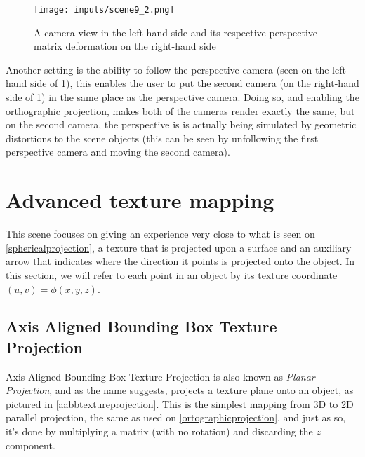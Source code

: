 \documentclass[cic,tc,english]{iiufrgs}
\begin{document}
\begin{figure}[hbt!]
    \caption{A camera view in the left-hand side and its respective perspective matrix deformation on the right-hand side}
    \begin{center}
        \texttt{[image: inputs/scene9\_2.png]}
    \end{center}
    \label{perspectivedeformationoutsideofndc}
\end{figure}

Another setting is the ability to follow the perspective camera (seen on the left-hand side of \cref{perspectivedeformationoutsideofndc}), this enables the user to put the second camera (on the right-hand side of \cref{perspectivedeformationoutsideofndc}) in the same place as the perspective camera. Doing so, and enabling the orthographic projection, makes both of the cameras render exactly the same, but on the second camera, the perspective is is actually being simulated by geometric distortions to the scene objects (this can be seen by unfollowing the first perspective camera and moving the second camera). %

%
\section{Advanced texture mapping}
\label{advancedtexturemappingscene}
This scene focuses on giving an experience very close to what is seen on
\cref{sphericalprojection}, a texture that is projected upon a surface and an auxiliary arrow that indicates where the direction it points is projected onto the object. In this section, we will refer to each point in an object by its texture coordinate $(u,v) = \phi(x,y,z)$.

\subsection{Axis Aligned Bounding Box Texture Projection}

Axis Aligned Bounding Box Texture Projection is also known as \textit{Planar Projection}, and as the name suggests, projects a texture plane onto an object, as pictured in \cref{aabbtextureprojection}. This is the simplest mapping from 3D to 2D parallel projection, the same as used on \cref{ortographicprojection}, and just as so, it's done by multiplying a matrix (with no rotation) and discarding the $z$ component.
\end{document}
